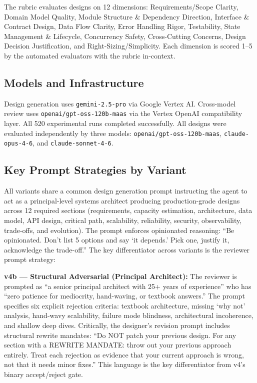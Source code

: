 \documentclass[conference]{IEEEtran}
\begin{document}
The rubric evaluates designs on 12 dimensions: Requirements/Scope Clarity, Domain Model Quality, Module Structure \& Dependency Direction, Interface \& Contract Design, Data Flow Clarity, Error Handling Rigor, Testability, State Management \& Lifecycle, Concurrency Safety, Cross-Cutting Concerns, Design Decision Justification, and Right-Sizing/Simplicity. Each dimension is scored 1--5 by the automated evaluators with the rubric in-context.

\subsection{Models and Infrastructure}
Design generation uses \texttt{gemini-2.5-pro} via Google Vertex AI. Cross-model review uses \texttt{openai/gpt-oss-120b-maas} via the Vertex OpenAI compatibility layer. All 520 experimental runs completed successfully. All designs were evaluated independently by three models: \texttt{openai/gpt-oss-120b-maas}, \texttt{claude-opus-4-6}, and \texttt{claude-sonnet-4-6}.

\subsection{Key Prompt Strategies by Variant}
All variants share a common design generation prompt instructing the agent to act as a principal-level systems architect producing production-grade designs across 12 required sections (requirements, capacity estimation, architecture, data model, API design, critical path, scalability, reliability, security, observability, trade-offs, and evolution). The prompt enforces opinionated reasoning: ``Be opinionated. Don't list 5 options and say `it depends.' Pick one, justify it, acknowledge the trade-off.'' The key differentiator across variants is the reviewer prompt strategy:

\textbf{v4b --- Structural Adversarial (Principal Architect):} The reviewer is prompted as ``a senior principal architect with 25+ years of experience'' who has ``zero patience for mediocrity, hand-waving, or textbook answers.'' The prompt specifies six explicit rejection criteria: textbook architecture, missing `why not' analysis, hand-wavy scalability, failure mode blindness, architectural incoherence, and shallow deep dives. Critically, the designer's revision prompt includes structural rewrite mandates: ``Do NOT patch your previous design. For any section with a REWRITE MANDATE: throw out your previous approach entirely. Treat each rejection as evidence that your current approach is wrong, not that it needs minor fixes.'' This language is the key differentiator from v4's binary accept/reject gate.
\end{document}
